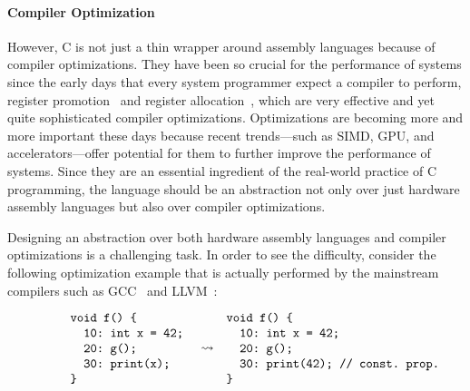 \paragraph{Compiler Optimization}


However, C is not just a thin wrapper around assembly languages because of compiler optimizations.
They have been so crucial for the performance of systems since the early days that every system
programmer expect a compiler to perform, \eg{} register promotion~\cite{reg-prom} and register
allocation~\cite{reg-alloc}, which are very effective and yet quite sophisticated compiler
optimizations.  Optimizations are becoming more and more important these days because recent
trends---such as SIMD, GPU, and accelerators---offer potential for them to further improve the
performance of systems.  Since they are an essential ingredient of the real-world practice of C
programming, the language should be an abstraction not only over just hardware assembly languages
but also over compiler optimizations.



Designing an abstraction over both hardware assembly languages and compiler optimizations is a
challenging task.  In order to see the difficulty, consider the following optimization example that
is actually performed by the mainstream compilers such as GCC~\cite{gcc} and LLVM~\cite{llvm}:

\[\begin{array}{rcl}
\begin{minipage}{0.27\textwidth}
\begin{verbatim}
void f() {
  10: int x = 42;
  20: g();
  30: print(x);
}
\end{verbatim}
\end{minipage}
&
\optarrow
&
\begin{minipage}{0.4\textwidth}
\begin{verbatim}
void f() {
  10: int x = 42;
  20: g();
  30: print(42); // const. prop.
}
\end{verbatim}
\end{minipage}
\end{array}\]


